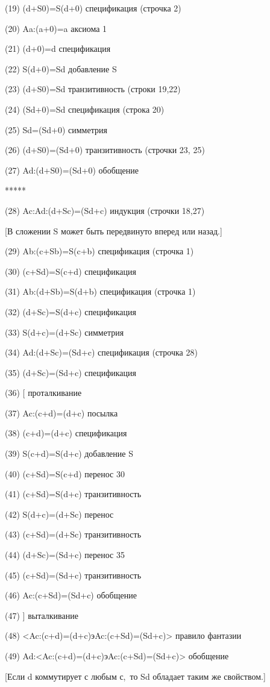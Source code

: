 \documentclass[../main.tex]{subfiles}
\begin{document}
(19) (d+S0)=S(d+0) спецификация (строчка 2)

(20) Aa:(a+0)=a аксиома 1

(21) (d+0)=d спецификация

(22) S(d+0)=Sd добавление S

(23) (d+S0)=Sd транзитивность (строки 19,22)

(24) (Sd+0)=Sd спецификация (строка 20)

(25) Sd=(Sd+0) симметрия

(26) (d+S0)=(Sd+0) транзитивность (строчки 23, 25)

(27) Ad:(d+S0)=(Sd+0) обобщение

*****

(28) Ac:Ad:(d+Sc)=(Sd+c) индукция (строчки 18,27)

{[}В сложении S может быть передвинуто вперед или назад.{]}

(29) Ab:(c+Sb)=S(c+b) спецификация (строчка 1)

(30) (c+Sd)=S(c+d) спецификация

(31) Ab:(d+Sb)=S(d+b) спецификация (строчка 1)

(32) (d+Sc)=S(d+c) спецификация

(33) S(d+c)=(d+Sc) симметрия

(34) Ad:(d+Sc)=(Sd+c) спецификация (строчка 28)

(35) (d+Sc)=(Sd+c) спецификация

(36) {[} проталкивание

(37) Ac:(c+d)=(d+c) посылка

(38) (c+d)=(d+c) спецификация

(39) S(c+d)=S(d+c) добавление S

(40) (c+Sd)=S(c+d) перенос 30

(41) (c+Sd)=S(d+c) транзитивность

(42) S(d+c)=(d+Sc) перенос

(43) (c+Sd)=(d+Sc) транзитивность

(44) (d+Sc)=(Sd+c) перенос 35

(45) (c+Sd)=(Sd+c) транзитивность

(46) Ac:(c+Sd)=(Sd+c) обобщение

(47) {]} выталкивание

(48) \textless Ac:(c+d)=(d+c)эAc:(c+Sd)=(Sd+c)\textgreater{} правило фантазии

(49) Ad:\textless Ac:(c+d)=(d+c)эAc:(c+Sd)=(Sd+c)\textgreater{} обобщение

{[}Если d коммутирует с любым с,~то Sd обладает таким же свойством.{]}
\end{document}
